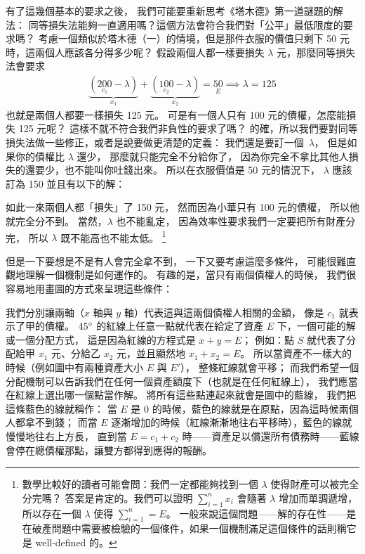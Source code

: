 \documentclass[10pt]{article}
\begin{document}
\begin{multicols*}{2}
有了這幾個基本的要求之後，
我們可能要重新思考《塔木德》第一道謎題的解法：
\textsf{同等損失法}能夠一直適用嗎？這個方法會符合我們對「公平」最低限度的要求嗎？
考慮一個類似於\textsf{塔木德（一）}的情境，但是那件衣服的價值只剩下 50 元時，這兩個人應該各分得多少呢？
假設兩個人都一樣要損失 $\lambda$ 元，那麼\textsf{同等損失法}會要求
\begin{align*}
	\underbrace{ \left( \underset{c_1}{200} - \lambda \right) }_{x_1}
	+
	\underbrace{ \left( \underset{c_2}{100} - \lambda \right) }_{x_2}
	= \underset{E}{50}
	\implies \lambda = 125
\end{align*}
也就是兩個人都要一樣損失 125 元。
可是有一個人只有 100 元的債權，怎麼能損失 125 元呢？
這樣不就不符合我們\textsf{非負性}的要求了嗎？
的確，所以我們要對\textsf{同等損失法}做一些修正，或者是說要做更清楚的定義：
我們還是要訂一個\ $\lambda$，
但是如果你的債權比 $\lambda$ 還少，
那麼就只能完全不分給你了，
因為你完全不拿比其他人損失的還要少，也不能叫你吐錢出來。
所以在衣服價值是 50 元的情況下，
$\lambda$ 應該訂為 150 並且有以下的解：

如此一來兩個人都「損失」了 150 元，
然而因為小華只有 100 元的債權，
所以他就完全分不到。
當然，$\lambda$ 也不能亂定，
因為\textsf{效率性}要求我們一定要把所有財產分完，
所以 $\lambda$ 既不能高也不能太低。
\footnote{
	數學比較好的讀者可能會問：我們一定都能夠找到一個 $\lambda$ 使得財產可以被完全分完嗎？
	答案是肯定的。我們可以證明 $\sum_{i=1}^nx_i$ 會隨著 $\lambda$ 增加而單調遞增，
	所以存在一個 $\lambda$ 使得 $\sum_{i=1}^n=E$。
	一般來說這個問題——解的存在性——是在破產問題中需要被檢驗的一個條件，如果一個機制滿足這個條件的話則稱它是 well-defined 的。
}

但是一下要想是不是有人會完全拿不到，
一下又要考慮這麼多條件，
可能很難直觀地理解一個機制是如何運作的。
有趣的是，當只有兩個債權人的時候，
我們很容易地用畫圖的方式來呈現這些條件：

我們分別讓兩軸（$x$ 軸與 $y$ 軸）代表這與這兩個債權人相關的金額，
像是 $c_1$ 就表示了甲的債權。
$45\degree$ 的紅線上任意一點就代表在給定了資產 $E$ 下，一個可能的解或一個分配方式，
這是因為紅線的方程式是 $x + y = E$；
例如：點 $S$ 就代表了分配給甲 $x_1$ 元、分給乙 $x_2$ 元，並且顯然地 $x_1+x_2=E$。
所以當資產不一樣大的時候（例如圖中有兩種資產大小 $E$ 與 $E'$），
整條紅線就會平移；
而我們希望一個分配機制可以告訴我們在任何一個資產額度下（也就是在任何紅線上），
我們應當在紅線上選出哪一個點當作解。
將所有這些點連起來就會是圖中的藍線，
我們把這條藍色的線就稱作：
當 $E$ 是 0 的時候，藍色的線就是在原點，因為這時候兩個人都拿不到錢；
而當 $E$ 逐漸增加的時候（紅線漸漸地往右平移時），藍色的線就慢慢地往右上方長，
直到當 $E=c_1+c_2$ 時——資產足以償還所有債務時——藍線會停在總債權那點，讓雙方都得到應得的報酬。


\end{multicols*}
\end{document}
